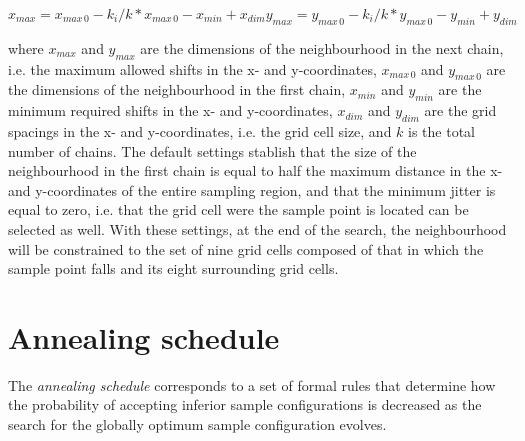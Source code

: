 \begin{equation}
  x_{max} = x_{max\,0} - k_i / k * x_{max\,0} - x_{min} + x_{dim}

  y_{max} = y_{max\,0} - k_i / k * y_{max\,0} - y_{min} + y_{dim}
\end{equation}

where $x_{max}$ and $y_{max}$ are the dimensions of the neighbourhood in the 
next chain, i.e. the maximum allowed shifts in the x- and y-coordinates, 
$x_{max\,0}$ and $y_{max\,0}$ are the dimensions of the neighbourhood in the 
first chain, $x_{min}$ and $y_{min}$ are the minimum required shifts in the x- 
and y-coordinates, $x_{dim}$ and $y_{dim}$ are the grid spacings in the x- and 
y-coordinates, i.e. the grid cell size, and $k$ is the total number of chains.
The default settings stablish that the size of the neighbourhood in the first
chain is equal to half the maximum distance in the x- and y-coordinates of the
entire sampling region, and that the minimum jitter is equal to zero, i.e. that
the grid cell were the sample point is located can be selected as well. With 
these settings, at the end of the search, the neighbourhood will be constrained 
to the set of nine grid cells composed of that in which the sample point falls
and its eight surrounding grid cells.

\section{Annealing schedule}

The \textit{annealing schedule} corresponds to a set of formal rules that 
determine how the probability of accepting inferior sample configurations is 
decreased as the search for the globally optimum sample configuration evolves.

